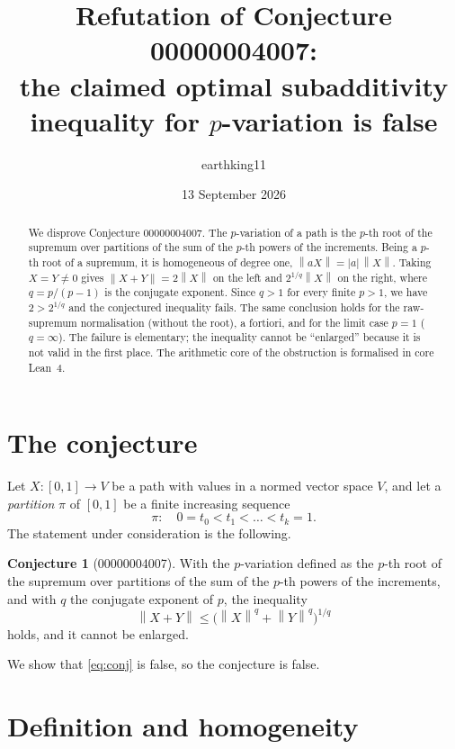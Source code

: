 \documentclass[11pt]{article}
\title{Refutation of Conjecture 00000004007:\\ the claimed optimal subadditivity inequality for $p$-variation is false}
\author{earthking11}
\date{13 September 2026}
\theoremstyle{definition}
\newtheorem{conjecture}[theorem]{Conjecture}
\newcommand{\norm}[1]{\left\lVert #1 \right\rVert}
\begin{document}
\maketitle

\begin{abstract}
We disprove Conjecture 00000004007.  The $p$-variation of a path is the
$p$-th root of the supremum over partitions of the sum of the $p$-th powers
of the increments.  Being a $p$-th root of a supremum, it is homogeneous of
degree one, $\norm{aX} = |a|\,\norm{X}$.  Taking $X = Y \neq 0$ gives
$\norm{X+Y} = 2\norm{X}$ on the left and $2^{1/q}\norm{X}$ on the right,
where $q = p/(p-1)$ is the conjugate exponent.  Since $q > 1$ for every
finite $p > 1$, we have $2 > 2^{1/q}$ and the conjectured inequality fails.
The same conclusion holds for the raw-supremum normalisation (without the
root), a fortiori, and for the limit case $p = 1$ ($q = \infty$).  The
failure is elementary; the inequality cannot be ``enlarged'' because it is
not valid in the first place.  The arithmetic core of the obstruction is
formalised in core Lean~4.
\end{abstract}

\section{The conjecture}

Let $X : [0,1] \to V$ be a path with values in a normed vector space $V$, and
let a \emph{partition} $\pi$ of $[0,1]$ be a finite increasing sequence
\[
  \pi : \quad 0 = t_0 < t_1 < \dots < t_k = 1 .
\]
The statement under consideration is the following.

\begin{conjecture}[00000004007]\label{conj}
With the $p$-variation defined as the $p$-th root of the supremum over
partitions of the sum of the $p$-th powers of the increments, and with $q$
the conjugate exponent of $p$, the inequality
\begin{equation}\label{eq:conj}
  \norm{X+Y} \le \bigl(\norm{X}^{q} + \norm{Y}^{q}\bigr)^{1/q}
\end{equation}
holds, and it cannot be enlarged.
\end{conjecture}

We show that \eqref{eq:conj} is false, so the conjecture is false.

\section{Definition and homogeneity}
\end{document}
